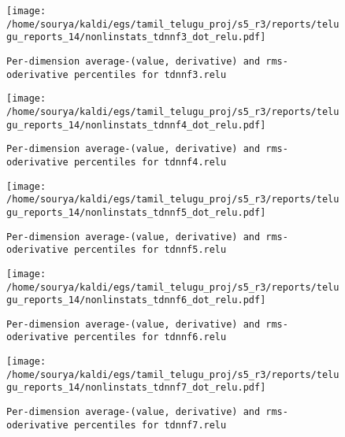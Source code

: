 \documentclass[prl,10pt,twocolumn]{revtex4}
\begin{document}
\newpage
\begin{figure}[h]
  \begin{center}
    \caption{\texttt{Per-dimension average-(value, derivative) and rms-oderivative percentiles for tdnnf3.relu}}
    \texttt{[image: /home/sourya/kaldi/egs/tamil\_telugu\_proj/s5\_r3/reports/telugu\_reports\_14/nonlinstats\_tdnnf3\_dot\_relu.pdf]}
  \end{center}
\end{figure}
\clearpage


\newpage
\begin{figure}[h]
  \begin{center}
    \caption{\texttt{Per-dimension average-(value, derivative) and rms-oderivative percentiles for tdnnf4.relu}}
    \texttt{[image: /home/sourya/kaldi/egs/tamil\_telugu\_proj/s5\_r3/reports/telugu\_reports\_14/nonlinstats\_tdnnf4\_dot\_relu.pdf]}
  \end{center}
\end{figure}
\clearpage


\newpage
\begin{figure}[h]
  \begin{center}
    \caption{\texttt{Per-dimension average-(value, derivative) and rms-oderivative percentiles for tdnnf5.relu}}
    \texttt{[image: /home/sourya/kaldi/egs/tamil\_telugu\_proj/s5\_r3/reports/telugu\_reports\_14/nonlinstats\_tdnnf5\_dot\_relu.pdf]}
  \end{center}
\end{figure}
\clearpage


\newpage
\begin{figure}[h]
  \begin{center}
    \caption{\texttt{Per-dimension average-(value, derivative) and rms-oderivative percentiles for tdnnf6.relu}}
    \texttt{[image: /home/sourya/kaldi/egs/tamil\_telugu\_proj/s5\_r3/reports/telugu\_reports\_14/nonlinstats\_tdnnf6\_dot\_relu.pdf]}
  \end{center}
\end{figure}
\clearpage


\newpage
\begin{figure}[h]
  \begin{center}
    \caption{\texttt{Per-dimension average-(value, derivative) and rms-oderivative percentiles for tdnnf7.relu}}
    \texttt{[image: /home/sourya/kaldi/egs/tamil\_telugu\_proj/s5\_r3/reports/telugu\_reports\_14/nonlinstats\_tdnnf7\_dot\_relu.pdf]}
  \end{center}
\end{figure}
\clearpage
\end{document}
